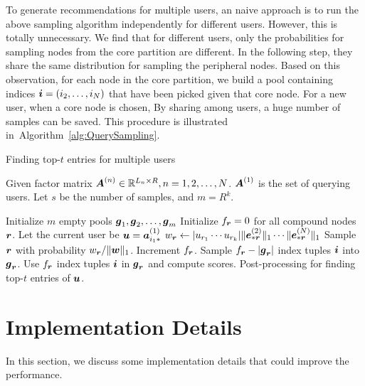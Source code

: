 \documentclass[10pt,journal,compsoc]{IEEEtran}
\newcommand{\V}[1]{{\boldsymbol{{\MakeLowercase{#1}}}}}
\newcommand{\ColVec}[3]{\V{#1}^{(#2)}_{#3}}
\newcommand{\NormColE}[2]{\norm{\ColVec{e}{#1}{*\V{#2}}}{1}}
\newcommand{\RowVecA}[1]{\V{a}^{(#1)}_{i_#1*}}
\newcommand{\M}[1]{{\boldsymbol{{\MakeUppercase{#1}}}}}
\newcommand{\FacMat}[2]{\M{#1}^{(#2)}}
\newcommand{\norm}[2]{\|#1\|_{#2}}
\newcommand{\Alg}[1]{Algorithm~\ref{alg:#1}}
\begin{document}
To generate recommendations for multiple users,
an naive approach is to run the above sampling algorithm independently for different users.
However, this is totally unnecessary.
We find that for different users,
only the probabilities for sampling nodes from the core partition are different.
In the following step, they share the same distribution for sampling the peripheral nodes.
Based on this observation, for each node in the core partition,
we build a pool containing indices $\V{i}=(i_2,\ldots,i_N)$ that have been picked given that core node.
For a new user, when a core node is chosen,
By sharing among users, a huge number of samples can be saved.
This procedure is illustrated in~\Alg{QuerySampling}.

\begin{algorithm}[!ht]
	\caption{Finding top-$t$ entries for multiple users}
	\label{alg:QuerySampling}
	Given factor matrix $\FacMat{A}{n}\in \mathbb{R}^{L_n\times R}, n = 1,2,\ldots,N$.
	$\FacMat{A}{1}$ is the set of querying users.
	Let $s$ be the number of samples, and $m=R^k$.
	\begin{algorithmic}[1]
		\State Initialize $m$ empty pools $\V{g}_1,\V{g}_2,\ldots,\V{g}_m$
		\State Initialize $f_{\V{r}} = 0$ for all compound nodes $\V{r}$.
		\State Let the current user be $\V{u}=\RowVecA{1}$
		\ForAll{$\V{r}=(r_1,\ldots,r_k)$}
		\State $w_\V{r} \leftarrow |u_{r_1}\cdots u_{r_k}|\NormColE{2}{r} \cdots \NormColE{N}{r}$
		\EndFor
		\State Sample $\V{r}$ with probability $w_\V{r}/\norm{\V{W}}{1}$.
		\label{line:Indexes}
		\State  Increment $f_{\V{r}}$.
		\EndFor
		\ForAll {$\V{r}$}
		\If {$f_\V{r} > |\V{g}_\V{r}|$ }
		\State Sample $f_{\V{r}} - |\V{g}_{\V{r}}|$ index tuples $\V{i}$ into $\V{g}_{\V{r}}$.
		\EndIf
		\State Use $f_{\V{r}}$ index tuples $\V{i}$ in $\V{g}_{\V{r}}$ and compute scores.
		\EndFor
		\State Post-processing for finding top-$t$ entries of $\V{u}$.
		\EndFor
	\end{algorithmic}
\end{algorithm}

\section{Implementation Details}
In this section, we discuss some implementation details that could improve the performance.
\end{document}
